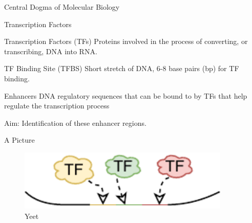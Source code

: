 \documentclass{beamer}
\begin{document}
    \begin{frame}{Central Dogma of Molecular Biology}
    \centering
        
    \end{frame}
    \begin{frame}{Transcription Factors}
        \begin{block}{Transcription Factors (TFs)}
            Proteins involved in the process of converting, or transcribing, DNA into RNA.
        \end{block}
        
        \begin{block}{TF Binding Site (TFBS)}
            Short stretch of DNA, 6-8 base pairs (bp) for TF binding.
        \end{block}
        \begin{block}{Enhancers}
            DNA regulatory sequences that can be bound to by TFs that help regulate the transcription process
        \end{block}
        
        \pause
         \begin{block}{Aim:}
         Identification of these enhancer regions.
         \end{block}
    \end{frame}
    
    \begin{frame}{A Picture}
        \begin{figure}
            \centering
            \includegraphics[width = 0.9\textwidth]{tfBinding.pdf}
            \caption{Yeet}
            \label{fig:yeet}
        \end{figure}
    \end{frame}
    
\end{document}
